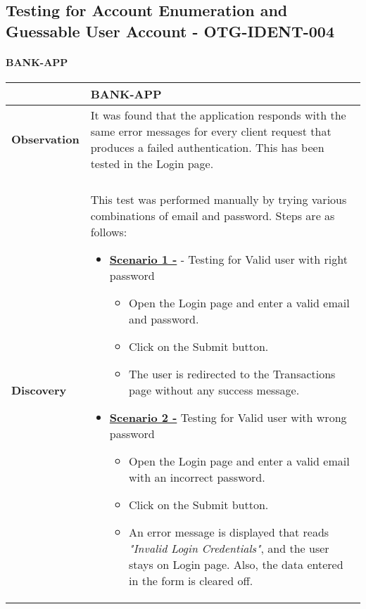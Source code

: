 \subsection{Testing for Account Enumeration and Guessable User Account - OTG-IDENT-004} \label{OTG-IDENT-004}

\paragraph{BANK-APP} \mbox{}
\begin{longtable*}{p{.20\textwidth} | p{.80\textwidth}}
    \hline
    & \textbf{BANK-APP} \\
    \hline
    \textbf{Observation} &
	 It was found that the application responds with the same error messages for every client request that produces a failed authentication. This has been tested in the Login page.
    \\\\
    \textbf{Discovery} &
       This test was performed manually by trying various combinations of email and password. Steps are as follows:
       \begin{itemize}
       \item \underline{\textbf{Scenario 1 -}} - Testing for Valid user with right password
       		\begin{itemize}
       		 \item Open the Login page and enter a valid email and password.
       		 
       		 \item Click on the Submit button.
       		 
       		 \item The user is redirected to the Transactions page without any success message.
       		\end{itemize}
        \item \underline{\textbf{Scenario 2 -}} Testing for Valid user with wrong password
        	\begin{itemize}
        	  \item Open the Login page and enter a valid email with an incorrect password.
        	  
        	  \item Click on the Submit button.
        	  
        	  \item An error message is displayed that reads \textit{"Invalid Login Credentials"}, and the user stays on Login page. Also, the data entered in the form is cleared off. 
        	\end{itemize}
        	

\end{itemize}
\end{longtable*}

